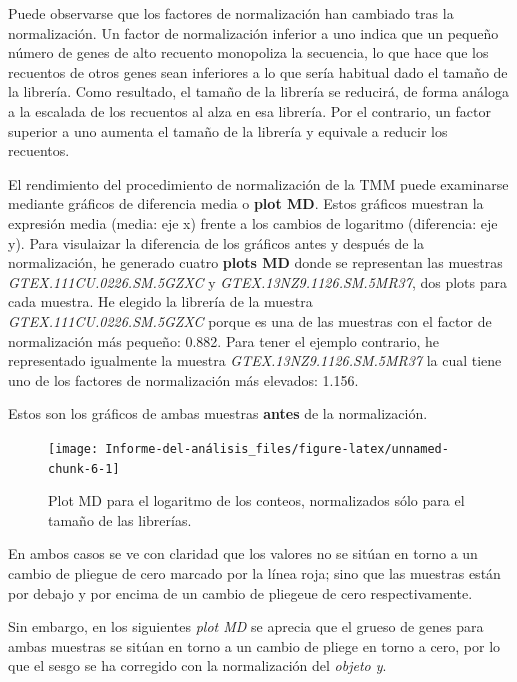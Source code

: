 \documentclass[]{article}
\begin{document}
Puede observarse que los factores de normalización han cambiado tras la
normalización. Un factor de normalización inferior a uno indica que un
pequeño número de genes de alto recuento monopoliza la secuencia, lo que
hace que los recuentos de otros genes sean inferiores a lo que sería
habitual dado el tamaño de la librería. Como resultado, el tamaño de la
librería se reducirá, de forma análoga a la escalada de los recuentos al
alza en esa librería. Por el contrario, un factor superior a uno aumenta
el tamaño de la librería y equivale a reducir los recuentos.

El rendimiento del procedimiento de normalización de la TMM puede
examinarse mediante gráficos de diferencia media o \textbf{plot MD}.
Estos gráficos muestran la expresión media (media: eje x) frente a los
cambios de logaritmo (diferencia: eje y). Para visulaizar la diferencia
de los gráficos antes y después de la normalización, he generado cuatro
\textbf{plots MD} donde se representan las muestras
\emph{GTEX.111CU.0226.SM.5GZXC} y \emph{GTEX.13NZ9.1126.SM.5MR37}, dos
plots para cada muestra. He elegido la librería de la muestra
\emph{GTEX.111CU.0226.SM.5GZXC} porque es una de las muestras con el
factor de normalización más pequeño: 0.882. Para tener el ejemplo
contrario, he representado igualmente la muestra
\emph{GTEX.13NZ9.1126.SM.5MR37} la cual tiene uno de los factores de
normalización más elevados: 1.156.

Estos son los gráficos de ambas muestras \textbf{antes} de la
normalización.

\begin{figure}[H]

{\centering \texttt{[image: Informe-del-análisis\_files/figure-latex/unnamed-chunk-6-1]} 

}

\caption{Plot MD para el logaritmo de los conteos, normalizados sólo para el tamaño de las librerías.}\label{fig:unnamed-chunk-6}
\end{figure}

En ambos casos se ve con claridad que los valores no se sitúan en torno
a un cambio de pliegue de cero marcado por la línea roja; sino que las
muestras están por debajo y por encima de un cambio de pliegeue de cero
respectivamente.

Sin embargo, en los siguientes \emph{plot MD} se aprecia que el grueso
de genes para ambas muestras se sitúan en torno a un cambio de pliege en
torno a cero, por lo que el sesgo se ha corregido con la normalización
del \emph{objeto y}.
\end{document}
